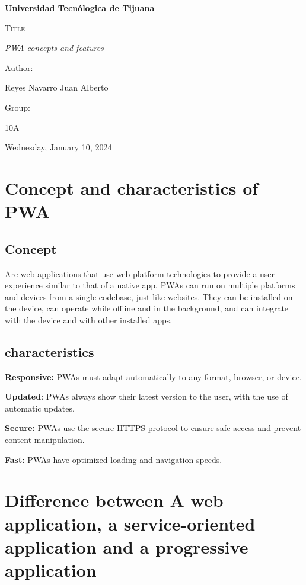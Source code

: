 \documentclass{article}
\begin{document}
	\begin{titlepage}
		\centering
		{\bfseries\LARGE Universidad Tecn\'ologica de Tijuana \par}
		\vspace{1cm}
		\vspace{3cm}
		{\scshape\Huge Title \par}
		\vspace{1cm}
		{\itshape\Large PWA concepts and features \par}
		\vfill
		{\Large Author: \par}
		{\Large Reyes Navarro Juan Alberto \par}
		\vfill
		{\Large Group: \par}
		{\Large 10A \par}
		\vfill
		{\Large Wednesday, January 10, 2024 \par}
	\end{titlepage}
	\newpage
	\section{Concept and characteristics of PWA}
		\subsection{Concept}
	Are web applications that use web platform technologies to provide a user experience similar to that of a native app. PWAs can run on multiple platforms and devices from a single codebase, just like websites. They can be installed on the device, can operate while offline and in the background, and can integrate with the device and with other installed apps.
		\subsection{characteristics}
		\begin{flushleft}
			\textbf{Responsive:} PWAs must adapt automatically to any format, browser, or device.
		
		\textbf{Updated}: PWAs always show their latest version to the user, with the use of automatic updates.
		
		\textbf{Secure:} PWAs use the secure HTTPS protocol to ensure safe access and prevent content manipulation.
		
		\textbf{Fast:} PWAs have optimized loading and navigation speeds.
		\end{flushleft}
		\section{Difference between A web application, a service-oriented application and a progressive application}
\end{document}
